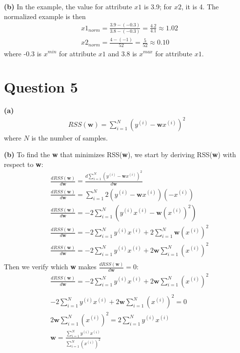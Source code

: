 \documentclass[leqno]{article}
\begin{document}
\hfill

\noindent \textbf{(b)} In the example, the value for attribute $x1$ is 3.9; for $x2$, it is 4. The normalized example is then
\begin{equation*}
\begin{split}
&x1_{norm} = \frac{3.9 - (-0.3)}{3.8 - (-0.3)} = \frac{4.2}{4.1} \approx 1.02\\
&x2_{norm} = \frac{4 - (-1)}{52} = \frac{5}{52} \approx 0.10
\end{split}
\end{equation*} 
where -0.3 is $x^{min}$ for attribute $x1$ and 3.8 is $x^{max}$ for attribute $x1$.

\hfill

\section*{Question 5} \textbf{(a)} 
\begin{equation*}
\begin{split}
RSS(\textbf{w}) = \sum_{i=1}^{N}(y^{(i)} - \textbf{w}x^{(i)})^2
\end{split}
\end{equation*} 
where $N$ is the number of samples.

\hfill

\noindent \textbf{(b)} To find the \textbf{w} that minimizes RSS(\textbf{w}), we start by deriving RSS(\textbf{w}) with respect to \textbf{w}:
\begin{equation*}
\begin{split}
&\frac{dRSS(\textbf{w})}{d\textbf{w}} = \frac{d\sum_{i=1}^{N}(y^{(i)} - \textbf{w}x^{(i)})^2}{d\textbf{w}}\\
&\frac{dRSS(\textbf{w})}{d\textbf{w}} = \sum_{i=1}^{N}2(y^{(i)} - \textbf{w}x^{(i)})(-x^{(i)})\\
&\frac{dRSS(\textbf{w})}{d\textbf{w}} = -2\sum_{i=1}^{N}(y^{(i)}x^{(i)} - \textbf{w}(x^{(i)})^2)\\
&\frac{dRSS(\textbf{w})}{d\textbf{w}} = -2\sum_{i=1}^{N}y^{(i)}x^{(i)} + 2\sum_{i=1}^{N}\textbf{w}(x^{(i)})^2\\
&\frac{dRSS(\textbf{w})}{d\textbf{w}} = -2\sum_{i=1}^{N}y^{(i)}x^{(i)} + 2\textbf{w}\sum_{i=1}^{N}(x^{(i)})^2\\  
\end{split}
\end{equation*}   
Then we verify which \textbf{w} makes $\frac{dRSS(\textbf{w})}{d\textbf{w}} = 0$:
\begin{equation*}
\begin{split}
&\frac{dRSS(\textbf{w})}{d\textbf{w}} = -2\sum_{i=1}^{N}y^{(i)}x^{(i)} + 2\textbf{w}\sum_{i=1}^{N}(x^{(i)})^2\\\\
&-2\sum_{i=1}^{N}y^{(i)}x^{(i)} + 2\textbf{w}\sum_{i=1}^{N}(x^{(i)})^2 = 0\\
&2\textbf{w}\sum_{i=1}^{N}(x^{(i)})^2 = 2\sum_{i=1}^{N}y^{(i)}x^{(i)}\\
&\textbf{w} = \frac{\sum_{i=1}^{N}y^{(i)}x^{(i)}}{\sum_{i=1}^{N}(x^{(i)})^2}\\  
\end{split}
\end{equation*}   
\end{document}
